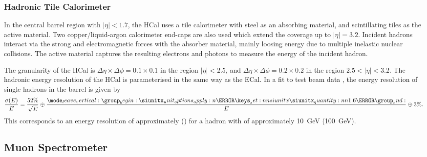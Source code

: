 \subsubsection{Hadronic Tile Calorimeter}
In the central barrel region with $|\eta| < 1.7$, the HCal uses a tile calorimeter with steel as an absorbing material, and scintillating tiles as the active material.
Two copper/liquid-argon calorimeter end-caps are also used which extend the coverage up to $|\eta| = 3.2$.
Incident hadrons interact via the strong and electromagnetic forces with the absorber material, mainly loosing energy due to multiple inelastic nuclear collisions.
The active material captures the resulting electrons and photons to measure the energy of the incident hadron.

The granularity of the HCal is $\Delta \eta \times \Delta \phi = 0.1 \times 0.1$ in the region $|\eta| < 2.5$, and $\Delta \eta \times \Delta \phi = 0.2 \times 0.2$ in the region $2.5 < |\eta| < 3.2$.
The hadronic energy resolution of the HCal is parameterised in the same way as the ECal.
In a fit to test beam data \cite{ATLAS-TDR-14}, the energy resolution of single hadrons in the barrel is given by
%
\begin{equation}
  \frac{\sigma(E)}{E} = \frac{\pct{52}}{\sqrt{E}} \oplus \frac{\SI{1.6}{\GeV}}{E} \oplus \pct{3} .
\end{equation}
%
This corresponds to an energy resolution of approximately  () for a hadron with \ET of approximately \SI{10}{\GeV} (\SI{100}{\GeV}).


%




\subsection{Muon Spectrometer}\label{sec:muon_spectrometer}

